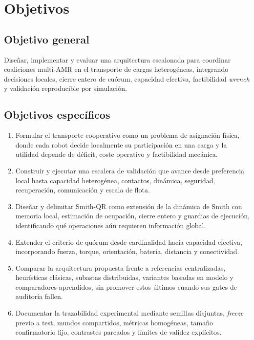 \section{Objetivos}

\subsection{Objetivo general}

Diseñar, implementar y evaluar una arquitectura escalonada para coordinar coaliciones multi-AMR en el transporte de cargas heterogéneas, integrando decisiones locales, cierre entero de cuórum, capacidad efectiva, factibilidad \emph{wrench} y validación reproducible por simulación.

\subsection{Objetivos específicos}

\begin{enumerate}[label=O\arabic*.,leftmargin=2.2em]
  \item Formular el transporte cooperativo como un problema de asignación física, donde cada robot decide localmente su participación en una carga y la utilidad depende de déficit, coste operativo y factibilidad mecánica.
  \item Construir y ejecutar una escalera de validación que avance desde preferencia local hasta capacidad heterogénea, contactos, dinámica, seguridad, recuperación, comunicación y escala de flota.
  \item Diseñar y delimitar Smith-QR como extensión de la dinámica de Smith con memoria local, estimación de ocupación, cierre entero y guardias de ejecución, identificando qué operaciones aún requieren información global.
  \item Extender el criterio de quórum desde cardinalidad hacia capacidad efectiva, incorporando fuerza, torque, orientación, batería, distancia y conectividad.
  \item Comparar la arquitectura propuesta frente a referencias centralizadas, heurísticas clásicas, subastas distribuidas, variantes basadas en modelo y comparadores aprendidos, sin promover estos últimos cuando sus gates de auditoría fallen.
  \item Documentar la trazabilidad experimental mediante semillas disjuntas, \emph{freeze} previo a test, mundos compartidos, métricas homogéneas, tamaño confirmatorio fijo, contrastes pareados y límites de validez explícitos.
\end{enumerate}

